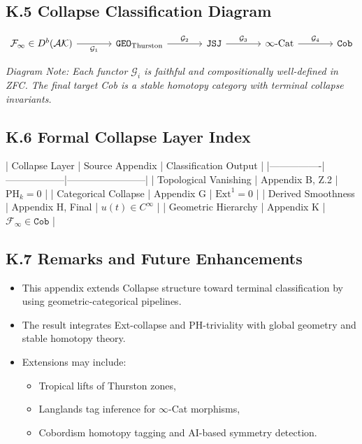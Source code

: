 \documentclass[11pt]{article}
\begin{document}
\begin{axiom}
\begin{axiom}
\subsection*{K.5 Collapse Classification Diagram}

\[
\begin{tikzcd}[column sep=large, row sep=large]
\mathcal{F}_\infty \in D^b(\mathcal{AK}) \arrow[r, "\mathcal{G}_1", swap] & 
\texttt{GEO}_{\text{Thurston}} \arrow[r, "\mathcal{G}_2"] & 
\texttt{JSJ} \arrow[r, "\mathcal{G}_3"] & 
\infty\text{-Cat} \arrow[r, "\mathcal{G}_4"] & 
\texttt{Cob}
\end{tikzcd}
\]

\textit{Diagram Note: Each functor \( \mathcal{G}_i \) is faithful and compositionally well-defined in ZFC.  
The final target Cob is a stable homotopy category with terminal collapse invariants.}

\subsection*{K.6 Formal Collapse Layer Index}

| Collapse Layer | Source Appendix | Classification Output |
|----------------|------------------|------------------------|
| Topological Vanishing | Appendix B, Z.2 | \( \mathrm{PH}_k = 0 \) |
| Categorical Collapse | Appendix G | \( \mathrm{Ext}^1 = 0 \) |
| Derived Smoothness | Appendix H, Final | \( u(t) \in C^\infty \) |
| Geometric Hierarchy | Appendix K | \( \mathcal{F}_\infty \in \texttt{Cob} \) |

\subsection*{K.7 Remarks and Future Enhancements}

\begin{itemize}
  \item This appendix extends Collapse structure toward terminal classification by using geometric-categorical pipelines.
  \item The result integrates Ext-collapse and PH-triviality with global geometry and stable homotopy theory.
  \item Extensions may include:
  \begin{itemize}
    \item Tropical lifts of Thurston zones,
    \item Langlands tag inference for \( \infty \)-Cat morphisms,
    \item Cobordism homotopy tagging and AI-based symmetry detection.
  \end{itemize}
\end{itemize}



\end{axiom}
\end{axiom}
\end{document}
